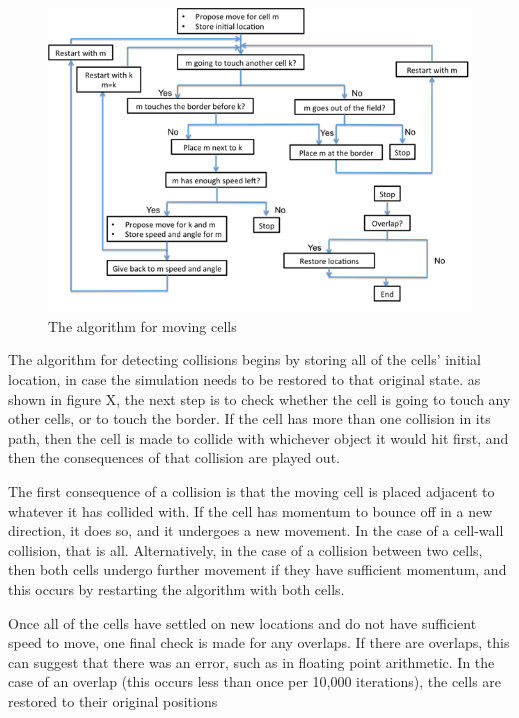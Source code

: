 \documentclass[12pt]{article}
\begin{document}
\begin{figure}[H]
\centering
\includegraphics[width=\textwidth]{media/algorithm.png}
\caption{The algorithm for moving cells}
\end{figure}

The algorithm for detecting collisions begins by storing all of the 
cells' initial location, in case the simulation needs to be restored to 
that original state. as shown in figure X, the next step is to check 
whether the cell is going to touch any other cells, or to touch the 
border. If the cell has more than one collision in its path, then the 
cell is made to collide with whichever object it would hit first, and 
then the consequences of that collision are played out. 

The first consequence of a collision is that the moving cell is placed 
adjacent to whatever it has collided with. If the cell has momentum to 
bounce off in a new direction, it does so, and it undergoes a new 
movement. In the case of a cell-wall collision, that is all. 
Alternatively, in the case of a collision between two cells, then both 
cells undergo further movement if they have sufficient momentum, and 
this occurs by restarting the algorithm with both cells.

Once all of the cells have settled on new locations and do not have 
sufficient speed to move, one final check is made for any overlaps. If 
there are overlaps, this can suggest that there was an error, such as in 
floating point arithmetic. In the case of an overlap (this occurs less 
than once per 10,000 iterations), the cells are restored to their 
original positions
\end{document}
